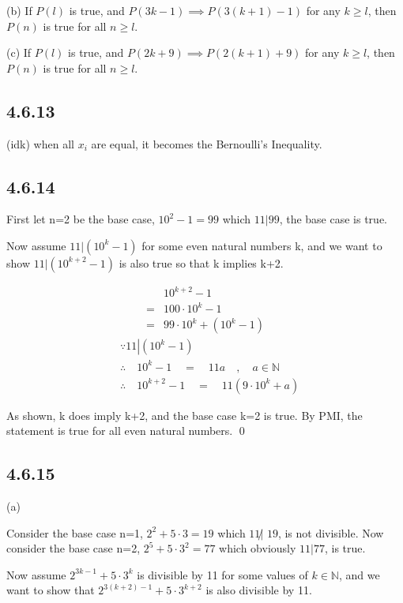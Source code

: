 \documentclass{article}
\begin{document}
(b) If $P(l)$ is true, and $P(3k-1)\implies P(3(k+1)-1)$ for any $k\geq l$, then $P(n)$ is true for all $n\geq l$.

(c) If $P(l)$ is true, and $P(2k+9)\implies P(2(k+1)+9)$ for any $k\geq l$, then $P(n)$ is true for all $n\geq l$.

\subsection*{4.6.13}

(idk) when all $x_i$ are equal, it becomes the Bernoulli's Inequality.

\subsection*{4.6.14}

First let n=2 be the base case, $10^2-1=99$ which $11 | 99$, the base case is true. 

Now assume $11|(10^k-1)$ for some even natural numbers k, and we want to show $11|(10^{k+2}-1)$ is also true so that k implies k+2.

\begin{center}
    $$\begin{aligned}&10^{k+2}-1\\=&100\cdot10^k-1\\=&99\cdot10^k+(10^k-1)\end{aligned}$$
    $$\begin{aligned}&\because11\left|\left(10^{k}-1\right)\right.\\&\therefore\quad10^{k}-1\quad=\quad11a\quad,\quad a\in\mathbb{N}\\&\therefore\quad10^{k+2}-1\quad=\quad11\left(9\cdot10^{k}+a\right)\end{aligned}$$
\end{center}

As shown, k does imply k+2, and the base case k=2 is true. By PMI, the statement is true for all even natural numbers. \qed

\subsection*{4.6.15}

(a)

Consider the base case n=1, $2^2+5\cdot 3=19$ which $11\not| \,\, 19$, is not divisible. Now consider the base case n=2, $2^5+5\cdot 3^2=77$ which obviously $11|77$, is true.

Now assume $2^{3k-1}+5\cdot 3^k$ is divisible by 11 for some values of $k\in\mathbb{N}$, and we want to show that $2^{3(k+2)-1}+5\cdot 3^{k+2}$ is also divisible by 11.
\end{document}
